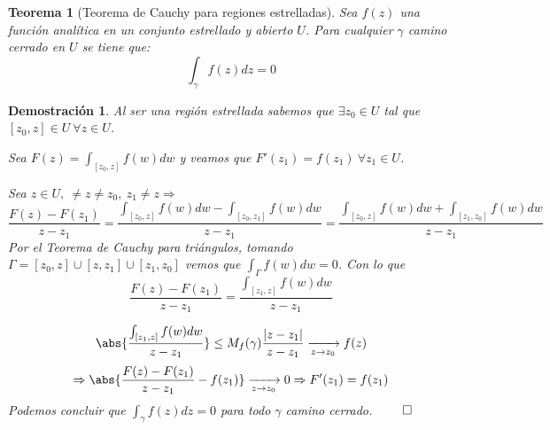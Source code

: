 \documentclass[12pt]{book}
\newtheorem{theorem}{Teorema}[chapter]
\newtheorem*{dem}{Demostración}
\begin{document}
\begin{theorem}[Teorema de Cauchy para regiones estrelladas]
Sea $f(z)$ una función analítica en un conjunto estrellado y abierto $U$. Para cualquier $\gamma$ camino cerrado en $U$ se tiene que:
$$
\int_{\gamma} f(z)dz = 0
$$
\end{theorem}

\begin{dem}
Al ser una región estrellada sabemos que $\exists z_0\in U$ tal que $[z_0,z]\in U\ \forall z \in U$.

Sea $F(z) = \int_{[z_0,z]}f(w)dw$ y veamos que $F'(z_1) = f(z_1)\ \forall z_1 \in U$.

Sea $z \in U,\ \neq z \neq z_0,\ z_1 \neq z \Rightarrow$
$$
\frac{F(z)-F(z_1)}{z-z_1} = \frac{\int_{[z_0,z]}f(w)dw- \int_{[z_0,z_1]}f(w)dw}{z-z_1} = \frac{\int_{[z_0,z]}f(w)dw+ \int_{[z_1,z_0]}f(w)dw}{z-z_1}
$$
Por el Teorema de Cauchy para triángulos, tomando $\Gamma = [z_0,z]\cup [z,z_1]\cup[z_1,z_0]$ vemos que $\int_\Gamma f(w)dw = 0$. Con lo que 
$$\frac{F(z)-F(z_1)}{z-z_1} = \frac{\int_{[z_1,z]}f(w)dw}{z-z_1}$$

$$
\abs{\frac{\int_{[z_1,z]}f(w)dw}{z-z_1}}\leq M_f(\gamma) \frac{|z-z_1|}{z-z_1} \xrightarrow[z\to z_0]{} f(z)
$$
$$
\Rightarrow \abs{\frac{F(z)-F(z_1)}{z-z_1}-f(z_1)}\xrightarrow[z\to z_0]{} 0 \Rightarrow F'(z_1) = f(z_1)
$$
Podemos concluir que $\int_\gamma f(z)dz=0$ para todo $\gamma$ camino cerrado. $\qed$
\end{dem}
\end{document}
